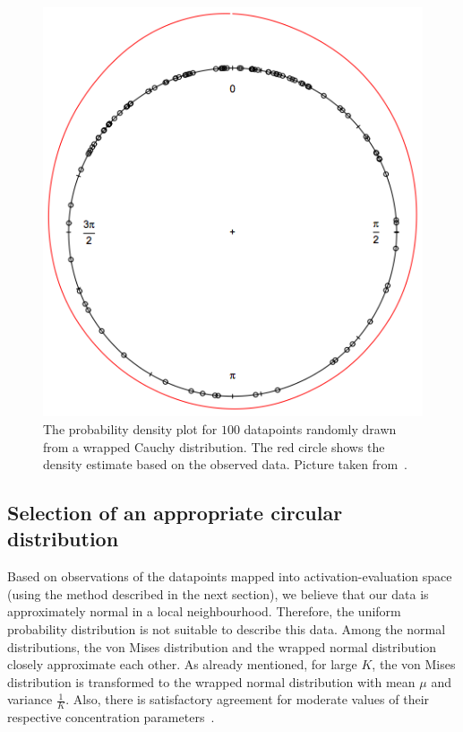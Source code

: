 \documentclass[10pt,journal,cspaper,compsoc]{IEEEtran}
\begin{document}
\begin{figure}[t!]
      \centering
      \includegraphics[scale=0.3]{figures/Ch6/wrapped_cauchy.png}
      \caption{The probability density plot for $100$ datapoints randomly drawn from a wrapped Cauchy distribution. The red circle shows the density estimate based on the observed data. Picture taken from~\cite{gill2010circular}.}
      \label{fig_wrapped_cauchy}
\end{figure}

\subsection{Selection of an appropriate circular distribution}

Based on observations of the datapoints mapped into activation-evaluation space (using the method described in the next section), we believe that our data is approximately normal in a local neighbourhood. Therefore, the uniform probability distribution is not suitable to describe this data. Among the normal distributions, the von Mises distribution and the wrapped normal distribution closely approximate each other. As already mentioned, for large $K$, the von Mises distribution is transformed to the wrapped normal distribution with mean $\mu$ and variance $\frac{1}{K}$. Also, there is satisfactory agreement for moderate values of their respective concentration parameters~\cite{stephens1963random}.
\end{document}

